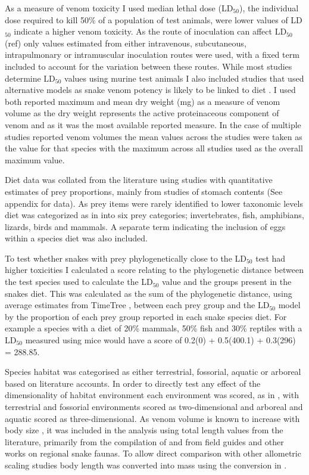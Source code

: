 As a measure of venom toxicity I used median lethal dose (LD$_{50}$), the individual dose required to kill 50\% of a population of test animals, were lower values of LD$_{50}$ indicate a higher venom toxicity. As the route of inoculation can affect LD$_{50}$ (ref) only values estimated from either intravenous, subcutaneous, intrapulmonary or intramuscular inoculation routes were used, with a fixed term included to account for the variation between these routes. While most studies determine LD$_{50}$ values using murine test animals I also included studies that used alternative models as snake venom potency is likely to be linked to diet \citep{barlow2009coevolution}. I used both reported maximum and mean dry weight (mg) as a measure of venom volume as the dry weight represents the active proteinaceous component of venom and as it was the most available reported measure. In the case of multiple studies reported venom volumes the mean values across the studies were taken as the value for that species with the maximum across all studies used as the overall maximum value.


Diet data was collated from the literature using studies with quantitative estimates of prey proportions, mainly from studies of stomach contents (See appendix for data). As prey items were rarely identified to lower taxonomic levels diet was categorized as in \citep{allen2013evolution} into six prey categories; invertebrates, fish, amphibians, lizards, birds and mammals. A separate term indicating the inclusion of eggs within a species diet was also included.


To test whether snakes with prey phylogenetically close to the LD$_{50}$ test had higher toxicities I calculated a score relating to the phylogenetic distance between the test species used to calculate the LD$_{50}$ value and the groups present in the snakes diet. This was calculated as the sum of the phylogenetic distance, using average estimates from TimeTree \citep{hedges2006timetree}, between each prey group and the LD$_{50}$ model by the proportion of each prey group reported in each snake species diet. For example a species with a diet of 20\% mammals, 50\% fish and 30\% reptiles with a LD$_{50}$ measured using mice would have a score of 0.2\*(0) + 0.5\*(400.1) + 0.3\*(296) = 288.85.


Species habitat was categorised as either terrestrial, fossorial, aquatic or arboreal based on literature accounts. In order to directly test any effect of the dimensionality of habitat environment each environment was scored, as in \citep{pawar2012dimensionality}, with terrestrial and fossorial environments scored as two-dimensional and arboreal and aquatic scored as three-dimensional.
As venom volume is known to increase with body size \citep{mirtschin2002influences}, it was included in the analysis using total length values from the literature, primarily from the compilation of \citep{boback2003empirical} and from field guides and other works on regional snake faunas. To allow direct comparison with other allometric scaling studies body length was converted into mass using the conversion in \citep{boback2003empirical}. 


